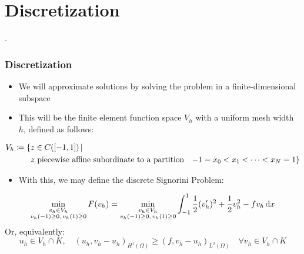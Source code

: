 \section{Discretization}
\PraesentationMasterWeissBlau
\begin{frame}
	\centering
	\vspace{6cm}
	\huge{\thesection . \secname}
\end{frame}
\PraesentationMasterStandard
\begin{frame}
	\frametitle{Discretization}
	\begin{itemize}
		\item We will approximate solutions by solving the problem in a finite-dimensional subspace
		\item This will be the finite element function space $V_h$ with a uniform mesh width $h$, defined as follows:
	\end{itemize}
\vspace{0.3cm}
\begin{definition}
	\vspace{-0.9cm}
\begin{align}
	V_h \coloneqq \{&z \in C([-1,1]) \, | \, \\ 
	&z \,\, \text{piecewise affine subordinate to a partition}\quad \mathmbox{-1}=x_0<x_1<\dots<x_N = 1 \} \nonumber
\end{align} 
\end{definition}
\vspace{-1cm}
\begin{itemize}
	\item With this, we may define the discrete Signorini Problem:
\end{itemize}
\vspace{0.3cm}
\begin{definition} 
		\vspace{-0.5cm}
	\begin{equation} \label{eq:discrete_minimization}
		\min_{\substack{v_h \in V_h \\ v_h(-1) \geq 0,\, v_h(1) \geq 0}} F(v_h) = \min_{\substack{v_h \in V_h \\ v_h(-1) \geq 0,\, v_h(1) \geq 0}} \int_{-1}^1{\frac{1}{2} (v_h')^2 + \frac{1}{2} v_h^2 - fv_h \dif x} 
	\end{equation}
	Or, equivalently:
	\begin{equation}\label{eq:discrete_variational_inequality}
		u_h \in V_h \cap K,\quad (u_h, v_h-u_h)_{H^1(\Omega)} \geq (f, v_h - u_h)_{L^2(\Omega)} \quad \forall v_h \in V_h \cap K
	\end{equation}
	
\end{definition}
\end{frame}

